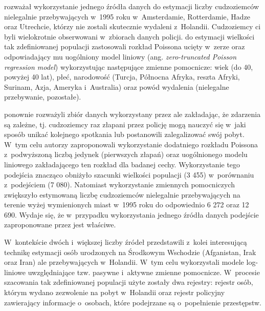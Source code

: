 \documentclass[12pt,a4paper]{article}
\begin{document}
\citet{van2003point} rozważał wykorzystanie jednego źródła danych do estymacji liczby cudzoziemców nielegalnie przebywających w~1995 roku w~Amsterdamie, Rotterdamie, Hadze oraz Utrechcie, którzy nie zostali skutecznie wydaleni z~Holandii. Cudzoziemcy ci byli wielokrotnie obserwowani w~zbiorach danych policji. \citet{van2003point} do estymacji wielkości tak zdefiniowanej populacji zastosowali rozkład Poissona ucięty w~zerze oraz odpowiadający mu uogólniony model liniowy (ang. \textit{zero-truncated Poisson regression model}) wykorzystując następujące zmienne pomocnicze: wiek (do 40, powyżej 40 lat), płeć, narodowość (Turcja, Północna Afryka, reszta Afryki, Surinam, Azja, Ameryka i~Australia) oraz powód wydalenia (nielegalne przebywanie, pozostałe).

\citet{godwin2017estimation} ponownie rozważyli zbiór danych wykorzystany przez \citet{van2003point} ale zakładając, że zdarzenia są zależne, tj. cudzoziemcy raz złapani przez policję mogą nauczyć się w~jaki sposób unikać kolejnego spotkania lub postanowili zalegalizować swój pobyt. W~tym celu autorzy zaproponowali wykorzystanie dodatniego rozkładu Poissona z~podwyższoną liczbą jedynek (pierwszych złapań) oraz uogólnionego modelu liniowego zakładającego ten rozkład dla badanej cechy. Wykorzystanie tego podejścia znacząco obniżyło szacunki wielkości populacji (3 455) w~porównaniu z~podejściem \citet{van2003point} (7 080). Natomiast wykorzystanie zmiennych pomocniczych zwiększyło estymowaną liczbę cudzoziemców nielegalnie przebywających na terenie wyżej wymienionych miast w~1995 roku do odpowiednio 6 272 oraz 12 690. Wydaje się, że w~przypadku wykorzystania jednego źródła danych podejście zaproponowane przez \citet{godwin2017estimation} jest właściwe. 

W~kontekście dwóch i~większej liczby źródeł \citet{van2012people} przedstawili z~kolei interesującą technikę estymacji osób urodzonych na Środkowym Wschodzie (Afganistan, Irak oraz Iran) ale przebywających w~Holandii. W~tym celu wykorzystali modele log-liniowe uwzględniające tzw. pasywne i~aktywne zmienne pomocnicze. W~procesie szacowania tak zdefiniowanej populacji użyte zostały dwa rejestry: rejestr osób, którym wydano zezwolenie na pobyt w~Holandii oraz rejestr policyjny zawierający informacje o~osobach, które podejrzane są o~popełnienie przestępstw. 
\end{document}
